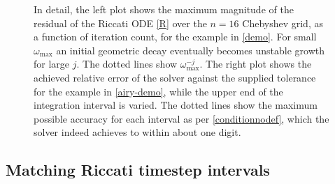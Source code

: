 \documentclass[10pt]{article}
\newcommand{\om}{\omega}
\newcommand{\AB}[1]{{\color{orange}#1}}
\begin{document}
\begin{figure}[tb]
{      In detail, the left plot shows the maximum magnitude of the residual
      of the Riccati ODE \cref{R} over the
      $n=16$ Chebyshev grid, as a function of iteration count,
      for the example in \cref{demo}.
      For small $\om_{\text{max}}$ an initial geometric decay eventually becomes
      unstable growth for large $j$. The dotted lines show $\om_{\text{max}}^{-j}$.
      The right plot shows the achieved relative error of the solver against the supplied tolerance for the example in \cref{airy-demo}, while the upper end of the integration interval is varied. The dotted lines show the maximum possible accuracy for each interval as per \cref{conditionnodef}, which the solver indeed achieves to within about one digit.
      }
\end{figure}    



\subsection{Matching Riccati timestep intervals}
\end{document}
